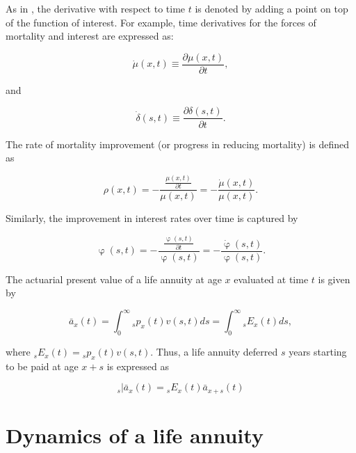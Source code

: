 \documentclass[12pt]{article}
\begin{document}
As in \citet{Vaupel2003}, the derivative with respect to time $t$ is denoted by adding a point on top of the function of interest. For example, time derivatives for the forces of mortality and interest are expressed as:

\begin{equation} \label{eq:mudot}
\dot{\mu}(x,t)\equiv\frac{\partial\mu(x,t)}{\partial t},
\end{equation}

and 

\begin{equation} \label{eq:mudot}
\dot{\delta}(s,t)\equiv\frac{\partial\delta(s,t)}{\partial t}.
\end{equation}



The rate of mortality improvement (or progress in reducing mortality) is defined as


\begin{equation} \label{eq:rho}
\rho(x,t)=-\frac{\frac{\mu(x,t)}{\partial t}}{\mu(x,t)} = - \frac{\dot{\mu}(x,t)}{\mu(x,t)}.
\end{equation}

Similarly, the improvement in interest rates over time is captured by 


\begin{equation} \label{eq:phi}
\upvarphi(s,t)=-\frac{\frac{\upvarphi(s,t)}{\partial t}}{\upvarphi(s,t)} = - \frac{\dot{\upvarphi}(s,t)}{\upvarphi(s,t)}.
\end{equation}


The actuarial present value of a life annuity at age $x$ evaluated at time $t$ is given by

\begin{equation}\label{eq:Annuity}
\bar{a}_x(t) = \int_0^\infty {}_sp_x(t) {v}(s,t)ds = \int_0^\infty {}_sE_x(t) ds,
\end{equation}

where ${}_sE_x(t)={}_sp_x(t) {v}(s,t)$. Thus, a life annuity deferred $s$ years starting to be paid at age $x+s$ is expressed as


\begin{equation}\label{eq:DefAnnuity}
{}_s|\bar{a}_x(t) = {}_sE_x(t) \bar{a}_{x+s}(t)
\end{equation}


\section{Dynamics of a life annuity}
\end{document}
